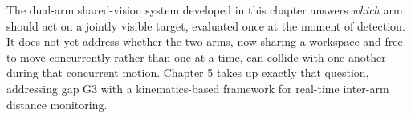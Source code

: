 The dual-arm shared-vision system developed in this chapter answers \emph{which} arm should act on
a jointly visible target, evaluated once at the moment of detection. It does not yet address whether
the two arms, now sharing a workspace and free to move concurrently rather than one at a time, can
collide with one another during that concurrent motion. Chapter 5 takes up exactly that question,
addressing gap G3 with a kinematics-based framework for real-time inter-arm distance monitoring.
